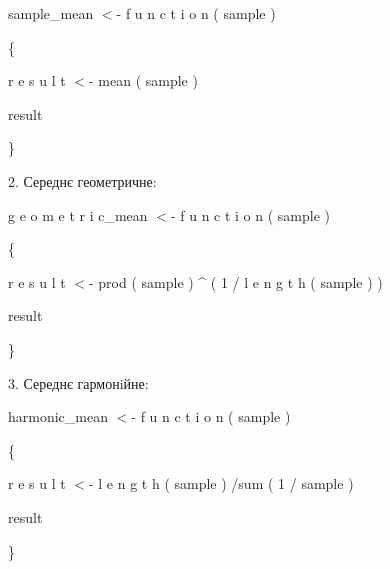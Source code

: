 \documentclass[a4paper,portrait,12pt]{article}
\begin{document}
\begin{flushleft}
sample\_mean $<$- f u n c t i o n ( sample )
\end{flushleft}


\{


\begin{flushleft}
r e s u l t $<$- mean ( sample )
\end{flushleft}


\begin{flushleft}
result
\end{flushleft}


\}





\begin{flushleft}
2. Середнє геометричне:
\end{flushleft}


\begin{flushleft}
g e o m e t r i c\_mean $<$- f u n c t i o n ( sample )
\end{flushleft}


\{


\begin{flushleft}
r e s u l t $<$- prod ( sample ) \^{} ( 1 / l e n g t h ( sample ) )
\end{flushleft}


\begin{flushleft}
result
\end{flushleft}


\}





\begin{flushleft}
3. Середнє гармонiйне:
\end{flushleft}


\begin{flushleft}
harmonic\_mean $<$- f u n c t i o n ( sample )
\end{flushleft}


\{


\begin{flushleft}
r e s u l t $<$- l e n g t h ( sample ) /sum ( 1 / sample )
\end{flushleft}


\begin{flushleft}
result
\end{flushleft}


\}
\end{document}
